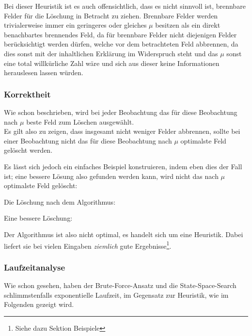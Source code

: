 Bei dieser Heuristik ist es auch offensichtlich, dass es nicht sinnvoll ist, brennbare Felder für die Löschung in Betracht zu ziehen. Brennbare Felder werden trivialerweise immer ein geringeres oder gleiches $\mu$ besitzen als ein direkt benachbartes brennendes Feld, da für brennbare Felder nicht diejenigen Felder berücksichtigt werden dürfen, welche vor dem betrachteten Feld abbrennen, da dies sonst mit der inhaltlichen Erklärung im Widerspruch steht und das $\mu$ sonst eine total willkürliche Zahl wäre und sich aus dieser keine Informationen herauslesen lassen würden.

\subsubsection{Korrektheit}
Wie schon beschrieben, wird bei jeder Beobachtung das für diese Beobachtung nach $\mu$ beste Feld zum Löschen ausgewählt.\\
Es gilt also zu zeigen, dass insgesamt nicht weniger Felder abbrennen, sollte bei einer Beobachtung nicht das für diese Beobachtung nach $\mu$ optimalste Feld gelöscht werden. 

Es lässt sich jedoch ein einfaches Beispiel konstruieren, indem eben dies der Fall ist; eine bessere Lösung also gefunden werden kann, wird nicht das nach $\mu$ optimalste Feld gelöscht:

\begin{multicols}{2}
Die Löschung nach dem Algorithmus:
{\ttfamily \small

}

Eine bessere Löschung:
{\ttfamily \small

}
\end{multicols}

Der Algorithmus ist also nicht optimal, es handelt sich um eine Heuristik. Dabei liefert sie bei vielen Eingaben \emph{ziemlich} gute Ergebnisse\footnote{Siehe dazu Sektion Beispiele}.

\subsubsection{Laufzeitanalyse}
Wie schon gesehen, haben der Brute-Force-Ansatz und die State-Space-Search schlimmstenfalls exponentielle Laufzeit, im Gegensatz zur Heuristik, wie im Folgenden gezeigt wird.

